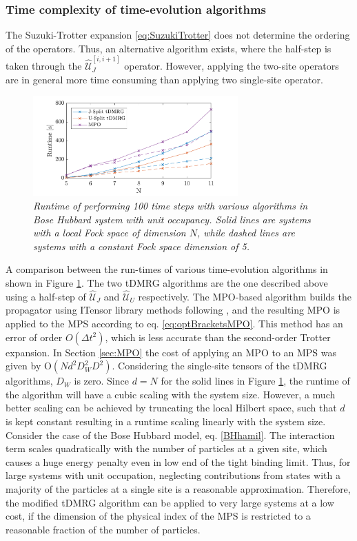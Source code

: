 \subsubsection{Time complexity of time-evolution algorithms}
The Suzuki-Trotter expansion \eqref{eq:SuzukiTrotter} does not determine the ordering of the operators. Thus, an alternative algorithm exists, where the half-step is taken through the $\hat{\mathcal{U}}_{J}^{[i,i+1]}$ operator. However, applying the two-site operators are in general more time consuming than applying two single-site operator.
\begin{figure}[h!]
    \centering
    \includegraphics[width=0.7\textwidth]{Figures/CompareRuntime.pdf}
    \caption{\textit{Runtime of performing 100 time steps with various algorithms in Bose Hubbard system with unit occupancy. Solid lines are systems with a local Fock space of dimension $N$, while dashed lines are systems with a constant Fock space dimension of 5.}}
    \label{fig:CompareRuntime}
\end{figure}
A comparison between the run-times of various time-evolution algorithms in shown in Figure \ref{fig:CompareRuntime}. The two tDMRG algorithms are the one described above using a half-step of $\hat{\mathcal{U}}_{J}$ and $\hat{\mathcal{U}}_{U}$ respectively. The MPO-based algorithm builds the propagator using ITensor library methods following \cite{Pollmann2015}, and the resulting MPO is applied to the MPS according to eq. \eqref{eq:optBracketsMPO}. This method has an error of order $O(\Delta t ^2)$, which is less accurate than the second-order Trotter expansion.
In Section \ref{sec:MPO} the cost of applying an MPO to an MPS was given by $\mathrm{O}(N d^2 D_W ^2 D^2)$. Considering the single-site tensors of the tDMRG algorithms, $D_W$ is zero. Since $d = N$ for the solid lines in Figure \ref{fig:CompareRuntime}, the runtime of the algorithm will have a cubic scaling with the system size. However, a much better scaling can be achieved by truncating the local Hilbert space, such that $d$ is kept constant resulting in a runtime scaling linearly with the system size.
Consider the case of the Bose Hubbard model, eq. \eqref{BHhamil}. The interaction term scales quadratically with the number of particles at a given site, which causes a huge energy penalty even in low end of the tight binding limit. Thus, for large systems with unit occupation, neglecting contributions from states with a majority of the particles at a single site is a reasonable approximation.
Therefore, the modified tDMRG algorithm can be applied to very large systems at a low cost, if the dimension of the physical index of the MPS is restricted to a reasonable fraction of the number of particles.   